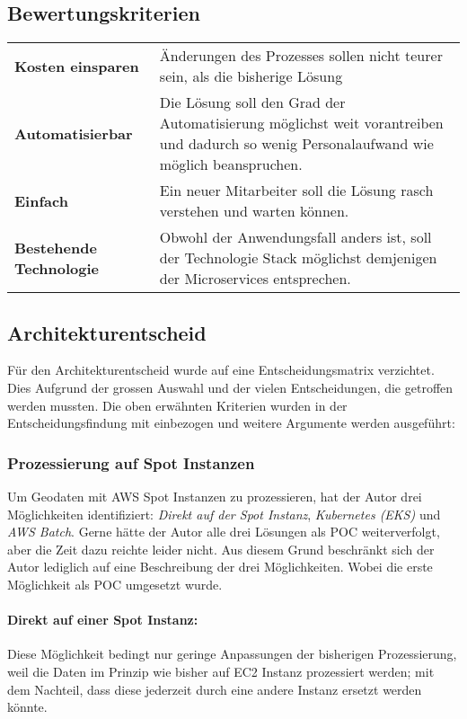 \subsection{Bewertungskriterien}
\begin{tabular}{p{}p{}}
    \textbf{Kosten einsparen} & Änderungen des Prozesses sollen nicht teurer sein, als die bisherige Lösung\\
    \textbf{Automatisierbar} & Die Lösung soll den Grad der Automatisierung möglichst weit vorantreiben und dadurch so wenig Personalaufwand wie möglich beanspruchen.\\
    \textbf{Einfach} & Ein neuer Mitarbeiter soll die Lösung rasch verstehen und warten können.\\
    \textbf{Bestehende Technologie} & Obwohl der Anwendungsfall anders ist, soll der Technologie Stack möglichst demjenigen der Microservices entsprechen.\\
\end{tabular}

\subsection{Architekturentscheid}
Für den Architekturentscheid wurde auf eine Entscheidungsmatrix verzichtet. Dies Aufgrund der grossen Auswahl und der vielen Entscheidungen, die getroffen werden mussten. Die oben erwähnten Kriterien wurden in der Entscheidungsfindung mit einbezogen und weitere Argumente werden ausgeführt:

\subsubsection{Prozessierung auf Spot Instanzen}
Um Geodaten mit AWS Spot Instanzen zu prozessieren, hat der Autor drei Möglichkeiten identifiziert: \emph{Direkt auf der Spot Instanz}, \emph{Kubernetes (EKS)} und \emph{AWS Batch}. Gerne hätte der Autor alle drei Lösungen als POC weiterverfolgt, aber die Zeit dazu reichte leider nicht. Aus diesem Grund beschränkt sich der Autor lediglich auf eine Beschreibung der drei Möglichkeiten. Wobei die erste Möglichkeit als POC umgesetzt wurde.

\paragraph{Direkt auf einer Spot Instanz:}
Diese Möglichkeit bedingt nur geringe Anpassungen der bisherigen Prozessierung, weil die Daten im Prinzip wie bisher auf EC2 Instanz prozessiert werden; mit dem Nachteil, dass diese jederzeit durch eine andere Instanz ersetzt werden könnte.

